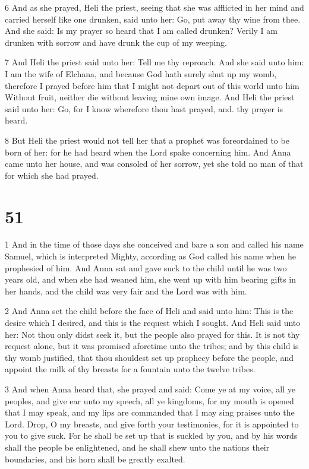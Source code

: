 \par 6 And as she prayed, Heli the priest, seeing that she was afflicted in her mind and carried herself like one drunken, said unto her: Go, put away thy wine from thee. And she said: Is my prayer so heard that I am called drunken? Verily I am drunken with sorrow and have drunk the cup of my weeping. 

\par 7 And Heli the priest said unto her: Tell me thy reproach. And she said unto him: I am the wife of Elchana, and because God hath surely shut up my womb, therefore I prayed before him that I might not depart out of this world unto him Without fruit, neither die without leaving mine own image. And Heli the priest said unto her: Go, for I know wherefore thou hast prayed, and. thy prayer is heard. 

\par 8 But Heli the priest would not tell her that a prophet was foreordained to be born of her: for he had heard when the Lord spake concerning him. And Anna came unto her house, and was consoled of her sorrow, yet she told no man of that for which she had prayed.

\chapter{51}

\par 1 And in the time of those days she conceived and bare a son and called his name Samuel, which is interpreted Mighty, according as God called his name when he prophesied of him. And Anna sat and gave suck to the child until he was two years old, and when she had weaned him, she went up with him bearing gifts in her hands, and the child was very fair and the Lord was with him. 

\par 2 And Anna set the child before the face of Heli and said unto him: This is the desire which I desired, and this is the request which I sought. And Heli said unto her: Not thou only didst seek it, but the people also prayed for this. It is not thy request alone, but it was promised aforetime unto the tribes; and by this child is thy womb justified, that thou shouldest set up prophecy before the people, and appoint the milk of thy breasts for a fountain unto the twelve tribes.

\par 3 And when Anna heard that, she prayed and said: Come ye at my voice, all ye peoples, and give ear unto my speech, all ye kingdoms, for my mouth is opened that I may speak, and my lips are commanded that I may sing praises unto the Lord. Drop, O my breasts, and give forth your testimonies, for it is appointed to you to give suck. For he shall be set up that is suckled by you, and by his words shall the people be enlightened, and he shall shew unto the nations their boundaries, and his horn shall be greatly exalted. 

